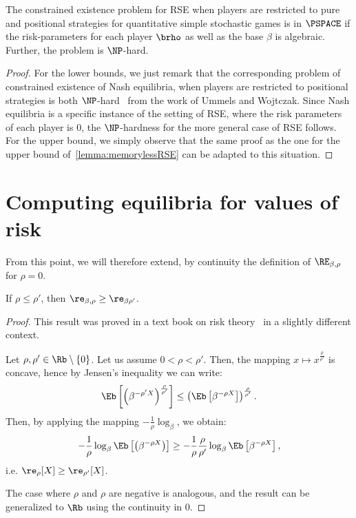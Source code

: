 \begin{lemma}\label{lemma:positionalRSE}
        The constrained existence problem for RSE when players are restricted to pure and positional strategies for quantitative simple stochastic games is  in $\PSPACE$ if the risk-parameters for each player $\brho$ as well as the base $\beta$ is algebraic. Further, the problem is $\NP$-hard.%
\end{lemma}
\begin{proof}
    For the lower bounds, we just remark that the corresponding problem of constrained existence of Nash equilibria, when players are restricted to positional strategies is both $\NP$-hard~\cite[Theorem 4.4]{UW11}
    from the work of Ummels and Wojtczak. Since Nash equilibria is a specific instance of the setting of RSE, where the risk parameters of each player is $0$, the $\NP$-hardness for the more general case of RSE follows.
    For the upper bound, we simply observe that the same proof as the one for the upper bound of~\cref{lemma:memorylessRSE} can be adapted to this situation. 
\end{proof}
\section{Computing equilibria for values of risk}

From this point, we will therefore extend, by continuity the definition of $\RE_{\beta,\rho}$ for $\rho = 0$.


\begin{lemma}
    If $\rho \leq \rho'$, then $\re_{\beta,\rho} \geq \re_{\beta \rho'}$.
\end{lemma}

\begin{proof}
    This result was proved in a text book on risk theory~\cite{KGD08} in a slightly different context.

    Let $\rho, \rho' \in \Rb \setminus \{0\}$.
    Let us assume $0 < \rho < \rho'$.
    Then, the mapping $x \mapsto x^{\frac{\rho}{\rho'}}$ is concave, hence by Jensen's inequality we can write:
    $$\Eb\left[ \left(\beta^{-\rho'X}\right)^{\frac{\rho}{\rho'}} \right] \leq \left( \Eb\left[ \beta^{-\rho X} \right] \right)^{\frac{\rho}{\rho'}}.$$
    Then, by applying the mapping $-\frac{1}{\rho} \log_\beta$, we obtain:
    $$-\frac{1}{\rho} \log_\beta \Eb\left[ \left(\beta^{-\rho X}\right) \right] \geq -\frac{1}{\rho} \frac{\rho}{\rho'} \log_\beta \Eb\left[ \beta^{-\rho X} \right],$$
    i.e. $\re_\rho[X] \geq \re_{\rho'}[X]$.

    The case where $\rho$ and $\rho$ are negative is analogous, and the result can be generalized to $\Rb$ using the continuity in $0$.
\end{proof}

